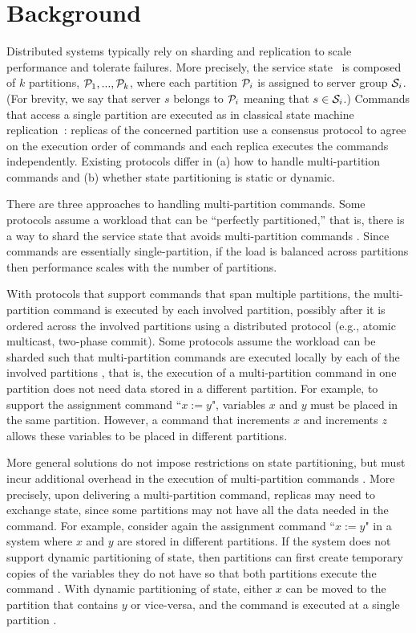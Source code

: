 \section{Background}
\label{sec:background}

Distributed systems typically rely on sharding and replication to scale performance and tolerate failures.
More precisely, the service state \vvt\ is composed of $k$ partitions, $\mathcal{P}_1, ..., \mathcal{P}_k$, where each partition $\mathcal{P}_i$ is assigned to server group $\mathcal{S}_i$. 
(For brevity, we say that server $s$ belongs to $\mathcal{P}_i$ meaning that $s \in \mathcal{S}_i$.)
Commands that access a single partition are executed as in classical state machine replication~\cite{Lam78,Sch90}: 
replicas of the concerned partition use a consensus protocol to agree on the execution order of commands and each replica executes the commands independently. 
Existing protocols differ in (a) how to handle multi-partition commands and (b) whether state partitioning is static or dynamic.

There are three approaches to handling multi-partition commands.
Some protocols assume a workload that can be ``perfectly partitioned,'' that is, there is a way to shard the service state that avoids multi-partition commands \cite{hoang2016,Nogueira17}.
Since commands are essentially single-partition, if the load is balanced across partitions then performance scales with the number of partitions.

With protocols that support commands that span multiple partitions, the multi-partition command is executed by each involved partition, possibly after it is ordered across the involved partitions using a distributed protocol (e.g., atomic multicast, two-phase commit).
Some protocols assume the workload can be sharded such that multi-partition commands are executed locally by each of the involved partitions \cite{Mu2016}, that is, the execution of a multi-partition command in one partition does not need data stored in a different partition.
For example, to support the assignment command ``$x := y$", variables $x$ and $y$ must be placed in the same partition.
However, a command that increments $x$ and increments $z$ allows these variables to be placed in different partitions.

More general solutions do not impose restrictions on state partitioning, but must incur additional overhead in the execution of multi-partition commands \cite{bezerra2014ssmr, corbett2013spanner}.
More precisely, upon delivering a multi-partition command, replicas may need to exchange state, since some partitions may not have all the data needed in the command.
For example, consider again the assignment command ``$x := y$" in a system where $x$ and $y$ are stored in different partitions.
If the system does not support dynamic partitioning of state, then partitions can first create temporary copies of the variables they do not have so that both partitions execute the command \cite{bezerra2014ssmr}.
With dynamic partitioning of state, either $x$ can be moved to the partition that contains $y$ or vice-versa, and the command is executed at a single partition \cite{hoang2016}.

